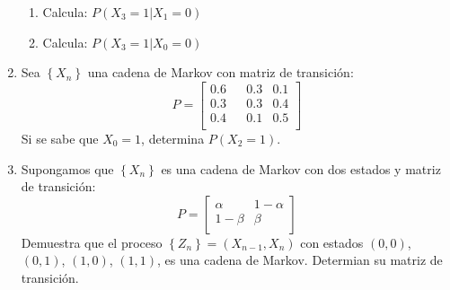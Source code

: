 \documentclass{report}
\begin{document}
\begin{enumerate}
\begin{enumerate}
              \item Calcula: $P\left(\left. X_3 = 1\right\vert X_1=0\right)$
              \item Calcula: $P\left(\left. X_3 = 1\right\vert X_0=0\right)$
          \end{enumerate}
    \item Sea $\left\{X_n\right\}$ una cadena de Markov con matriz de transición:
          $$P= \left[
                  \begin{matrix}
                      0.6 &  & 0.3 & 0.1 \\
                      0.3 &  & 0.3 & 0.4 \\
                      0.4 &  & 0.1 & 0.5 \\
                  \end{matrix}
                  \right]
          $$
          Si se sabe que $X_0=1$, determina $P(X_2 = 1)$.
    \item Supongamos que $\left\{X_n\right\}$ es una cadena de Markov con dos estados y matriz de transición:
          $$P= \left[
                  \begin{matrix}
                      \alpha  & 1-\alpha \\
                      1-\beta & \beta    \\
                  \end{matrix}
                  \right]
          $$
          Demuestra que el proceso $\left\{Z_n\right\}= (X_{n-1}, X_n)$ con estados $(0,0)$, $(0,1)$, $(1,0)$, $(1,1)$, es una cadena de Markov. Determian su matriz de transición.




\end{enumerate}
\end{document}
